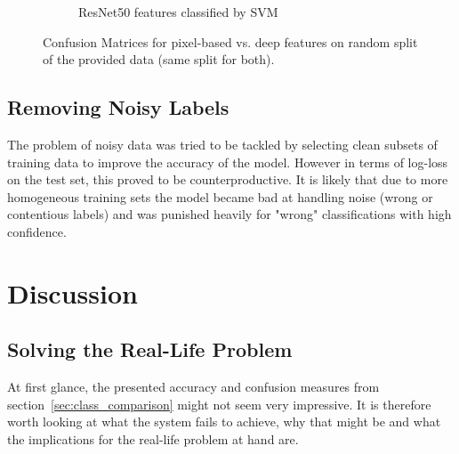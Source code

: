 \documentclass[11pt]{article}
\begin{document}
\begin{figure}
\begin{subfigure}[t]{.5\textwidth}
			\caption{ResNet50 features classified by SVM}
		\end{subfigure}
	\caption{Confusion Matrices for pixel-based vs. deep features on random split of the provided data (same split for both).}
	\label{fig:pixel_based_cm}
	\end{figure}

	\subsection{Removing Noisy Labels}
	\label{sec:noisy_labels}
	The problem of noisy data was tried to be tackled by selecting clean subsets of training data to improve the accuracy of the model. However in terms of log-loss on the test set, this proved to be counterproductive. It is likely that due to more homogeneous training sets the model became bad at handling noise (wrong or contentious labels) and was punished heavily for "wrong" classifications with high confidence.
	
	\section{Discussion}
	\label{sec:discussion}
	
	\subsection{Solving the Real-Life Problem}
	At first glance, the presented accuracy and confusion measures from section~\ref{sec:class_comparison} might not seem very impressive. It is therefore worth looking at what the system fails to achieve, why that might be and what the implications for the real-life problem at hand are.
	
\end{document}

